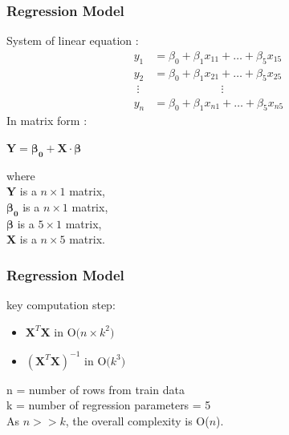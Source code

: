 \documentclass[11pt]{beamer}
\begin{document}
\begin{frame}
\frametitle{Regression Model}
\begin{tcolorbox}[colback=blue!5,colframe=blue!40!black,title=Regression model]
System of linear equation :
\begin{equation}
\begin{alignedat}{4}
y_1 &= \beta_0  + \beta_1 x_{11} + \dots + \beta_5 x_{15}\\
y_2 &= \beta_0 + \beta_1 x_{21} + \dots + \beta_5 x_{25}\\
\;\vdots  &            \qquad\qquad\qquad\vdots \\
y_n &= \beta_0 + \beta_1 x_{n1} + \dots + \beta_5 x_{n5}
\end{alignedat}
\end{equation}
In matrix form :

\centering
\(\textbf{Y}= \boldsymbol{\beta_0}+\textbf{X} \cdot \boldsymbol{\beta} \)

\raggedright
where\\
\(\textbf{Y}\) is a \(n\times1\) matrix,\\
\(\boldsymbol{\beta_0}\) is a \(n\times 1\) matrix,\\
\(\boldsymbol{\beta}\) is a \(5\times 1\) matrix,\\
\(\textbf{X}\) is a \(n\times 5\) matrix.
\end{tcolorbox}
\end{frame}



\begin{frame}
\frametitle{Regression Model}
\begin{tcolorbox}[colback=blue!5,colframe=blue!40!black,title=Complexity]
key computation step:
\begin{itemize}
\item \(\textbf{X}^T\textbf{X} \mbox{ in O(} n\times k^2 \mbox{)}\)
\item \((\textbf{X}^T\textbf{X})^{-1} \mbox{ in O(} k^3 \mbox{)}\)
\end{itemize}
n = number of rows from train data\\
k = number of regression parameters = 5\\
As \(n>>k\), the overall complexity is O(\(n\)).
\end{tcolorbox}
\end{frame}
\end{document}
